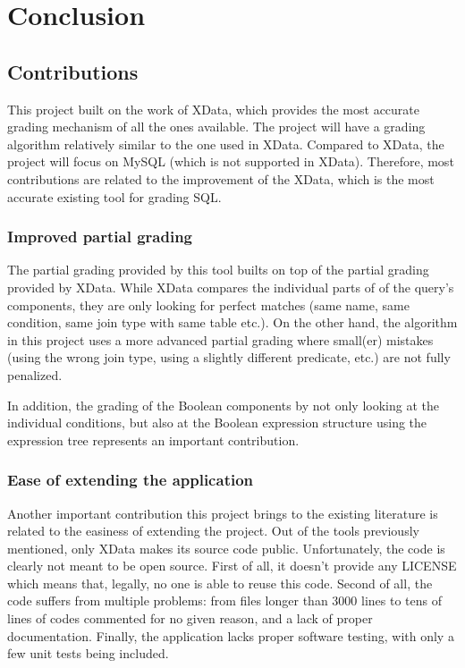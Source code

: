 \chapter{Conclusion}

\section{Contributions}
This project built on the work of XData, which provides the most accurate grading mechanism of all the ones available. The project will have a grading algorithm relatively similar to the one used in XData. Compared to XData, the project will focus on MySQL (which is not supported in XData). Therefore, most contributions are related to the improvement of the XData, which is the most accurate existing tool for grading SQL.

\subsection{Improved partial grading}
The partial grading provided by this tool builts on top of the partial grading provided by XData. While XData compares the individual parts of of the query's components, they are only looking for perfect matches (same name, same condition, same join type with same table etc.). On the other hand, the algorithm in this project uses a more advanced partial grading where small(er) mistakes (using the wrong join type, using a slightly different predicate, etc.) are not fully penalized. 

In addition, the grading of the Boolean components by not only looking at the individual conditions, but also at the Boolean expression structure using the expression tree represents an important contribution.
\subsection{Ease of extending the application}

Another important contribution this project brings to the existing literature is related to the easiness of extending the project. Out of the tools previously mentioned, only XData makes its source code public. Unfortunately, the code is clearly not meant to be open source. First of all, it doesn't provide any LICENSE which means that, legally, no one is able to reuse this code. Second of all, the code suffers from multiple problems: from files longer than 3000 lines to tens of lines of codes commented for no given reason, and a lack of proper documentation. Finally, the application lacks proper software testing, with only a few unit tests being included.

